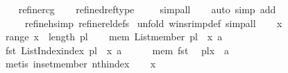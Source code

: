 \begin{isabellebody}
\ \ \isamarkupfalse%
\ {\isacharparenleft}{\kern0pt}refine{\isacharunderscore}{\kern0pt}rcg{\isacharparenright}{\kern0pt}\isanewline
\ \ \isamarkupfalse%
\ {\isacharparenleft}{\kern0pt}refine{\isacharunderscore}{\kern0pt}dref{\isacharunderscore}{\kern0pt}type{\isacharparenright}{\kern0pt}\ %
\isanewline
\ \ \isamarkupfalse%
\ simp{\isacharunderscore}{\kern0pt}all\isanewline
\ \ \isamarkupfalse%
\ {\isacharparenleft}{\kern0pt}auto\ simp\ add{\isacharcolon}{\kern0pt}\ \isanewline
\ \ \ \ \ refine{\isacharunderscore}{\kern0pt}hsimp\ refine{\isacharunderscore}{\kern0pt}rel{\isacharunderscore}{\kern0pt}defs{\isacharparenright}{\kern0pt}\isanewline
{}\isamarkupfalse%
\ {\isacharparenleft}{\kern0pt}unfold\ winsr{\isacharunderscore}{\kern0pt}imp{\isacharprime}{\kern0pt}{\isacharunderscore}{\kern0pt}def{\isacharcomma}{\kern0pt}\ simp{\isacharunderscore}{\kern0pt}all{\isacharparenright}{\kern0pt}\isanewline
\ \ \isamarkupfalse%
\ x{}\isanewline
\ \ \isamarkupfalse%
\ range{\isacharcolon}{\kern0pt}\ {\isachardoublequoteopen}x{}\ {\isacharless}{\kern0pt}\ length\ pl{\isachardoublequoteclose}\isanewline
\ \ \isamarkupfalse%
\ mem{\isacharcolon}{\kern0pt}\ {\isachardoublequoteopen}List{\isachardot}{\kern0pt}member\ {\isacharparenleft}{\kern0pt}pl\ {\isacharbang}{\kern0pt}\ x{}{\isacharparenright}{\kern0pt}\ a{\isachardoublequoteclose}\isanewline
\ \ \isamarkupfalse%
\ fst{\isacharcolon}{\kern0pt}\ {\isachardoublequoteopen}List{\isacharunderscore}{\kern0pt}Index{\isachardot}{\kern0pt}index\ {\isacharparenleft}{\kern0pt}pl\ {\isacharbang}{\kern0pt}\ x{}{\isacharparenright}{\kern0pt}\ a\ {\isacharequal}{\kern0pt}\ {}{\isachardoublequoteclose}\isanewline
\ \ \isamarkupfalse%
\ mem\ fst\ \isamarkupfalse%
\ {\isachardoublequoteopen}pl{\isacharbang}{\kern0pt}x{}{\isacharbang}{\kern0pt}{}\ {\isacharequal}{\kern0pt}\ a{\isachardoublequoteclose}\isanewline
\ \ \ \ \isamarkupfalse%
\ {\isacharparenleft}{\kern0pt}metis\ in{\isacharunderscore}{\kern0pt}set{\isacharunderscore}{\kern0pt}member\ nth{\isacharunderscore}{\kern0pt}index{\isacharparenright}{\kern0pt}\isanewline
{}\isamarkupfalse%
\isanewline
\ \ \isamarkupfalse%
\ x{}\isanewline
\ \ \isamarkupfalse%

\end{isabellebody}
